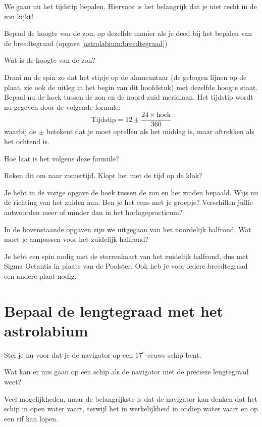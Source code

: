 We gaan nu het tijdstip bepalen. Hiervoor is het belangrijk dat je niet recht in de zon kijkt!
\begin{opgave}
 Bepaal de hoogte van de zon, op dezelfde manier als je deed bij het bepalen van de breedtegraad (opgave \ref{astrolabium:breedtegraad})
 \begin{subopgave}
 Wat is de hoogte van de zon?
 \end{subopgave}
 Draai nu de spin zo dat het stipje op de almucantaar (de gebogen lijnen op de plaat, zie ook de uitleg in het begin van dit hoofdstuk) met dezelfde hoogte staat. Bepaal nu de hoek tussen de zon en de noord-zuid meridiaan. Het tijdstip wordt nu gegeven door de volgende formule:
 \[ \textrm{Tijdstip} = 12 \pm \frac{24\times\textrm{hoek}}{360} \]
 waarbij de $\pm$ betekent dat je moet optellen als het middag is, maar aftrekken als het ochtend is.
 \begin{subopgave}
  Hoe laat is het volgens deze formule?
 \end{subopgave}
 \begin{subopgave}
  Reken dit om naar zomertijd. Klopt het met de tijd op de klok?
 \end{subopgave}
\end{opgave}

\begin{opgave}[\discussie]
 Je hebt in de vorige opgave de hoek tussen de zon en het zuiden bepaald. Wijs nu de richting van het zuiden aan. Ben je het eens met je groepje? Verschillen jullie antwoorden meer of minder dan in het horlogepracticum?
\end{opgave}

\begin{opgave}
 In de bovenstaande opgaven zijn we uitgegaan van het noordelijk halfrond. Wat moet je aanpassen voor het zuidelijk halfrond?
 \begin{antwoord}
  Je hebt een spin nodig met de sterrenkaart van het zuidelijk halfrond, dus met Sigma Octantis in plaats van de Poolster. Ook heb je voor iedere breedtegraad een andere plaat nodig.
 \end{antwoord}

\end{opgave}

\section{Bepaal de lengtegraad met het astrolabium}
Stel je nu voor dat je de navigator op een $17^e$-eeuws schip bent. 
\begin{opgave}
 Wat kan er mis gaan op een schip als de navigator niet de precieze lengtegraad weet?
 \begin{antwoord}
  Veel mogelijkheden, maar de belangrijkste is dat de navigator kan denken dat het schip in open water vaart, terwijl het in werkelijkheid in ondiep water vaart en op een rif kan lopen.
 \end{antwoord}
\end{opgave}

